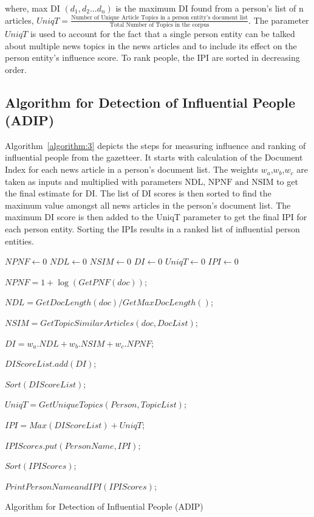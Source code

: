 where, max DI $(d_1,d_2...d_n)$ is the maximum DI found from a person's list of n articles, $UniqT = \frac{\text{Number of Unique Article Topics in a person entity's document list}}{\text{Total Number of Topics in the corpus}}$. The parameter $UniqT$  is used to account for the fact that a single person entity can be talked about multiple news topics in the news articles and to include its effect on the person entity's influence score. %
To rank people, the IPI are sorted in decreasing order. %
  
\subsection{Algorithm for Detection of Influential People (ADIP)}

Algorithm~\ref{algorithm:3} depicts the steps for measuring influence and ranking of influential people from the gazetteer. It starts with calculation of the Document Index for each news article in a person's document list. The weights $w_a$,$w_b$,$w_c$ are taken as inputs and multiplied with parameters $\text{NDL, NPNF and NSIM}$  to get the final estimate for DI. The list of DI scores is then sorted to find the maximum value amongst all news articles in the person's document list. The maximum DI score is then added to the UniqT parameter to get the final IPI for each person entity. Sorting the IPIs results in a ranked list of influential person entities.  


\begin{algorithm*}[!th]
\begin{algorithmic}
  

 $NPNF \leftarrow $0
 $NDL \leftarrow $0
 $NSIM \leftarrow $0
 $DI\leftarrow $0
 $UniqT\leftarrow $0
 $IPI\leftarrow $0\;  
  
     {
	{	
		$NPNF=1+\log (GetPNF(doc))$;
		
$NDL=GetDocLength(doc)/GetMaxDocLength()$;

		$ NSIM=GetTopicSimilarArticles(doc,DocList)$;

		$DI=w_a . NDL+w_b . NSIM+ w_c . NPNF$;
		
		$DIScoreList.add(DI)$;
 	 }
		$Sort(DIScoreList)$;

		$UniqT=GetUniqueTopics(Person,TopicList)$;

		$IPI=Max(DIScoreList)+UniqT$;

		$IPIScores.put(PersonName,IPI)$;
       }
	$Sort(IPIScores)$;

	$PrintPersonNameandIPI(IPIScores)$;

\EndFunction
\end{algorithmic}
\caption{Algorithm for Detection of Influential People (ADIP)}
\label{algorithm:3}
\end{algorithm*}

